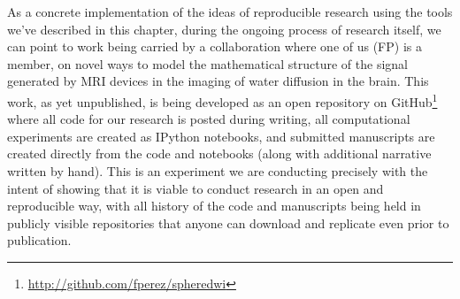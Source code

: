 \documentclass[ChapterTOCs,krantz2]{krantz} %
\begin{document}
As a concrete implementation of the ideas of reproducible research using the
tools we've described in this chapter, during the ongoing process of research
itself, we can point to work being carried by a collaboration where one of us
(FP) is a member, on novel ways to model the mathematical structure of the
signal generated by MRI devices in the imaging of water diffusion in the
brain.  This work, as yet unpublished, is being developed as an open repository
on GitHub\footnote{\url{http://github.com/fperez/spheredwi}} where all code
for our research is posted during writing, all computational experiments are
created as IPython notebooks, and submitted manuscripts are created directly
from the code and notebooks (along with additional narrative written by hand).
This is an experiment we are conducting precisely with the intent of showing
that it is viable to conduct research in an open and reproducible way, with all
history of the code and manuscripts being held in publicly visible repositories
that anyone can download and replicate even prior to publication. 
\end{document}

